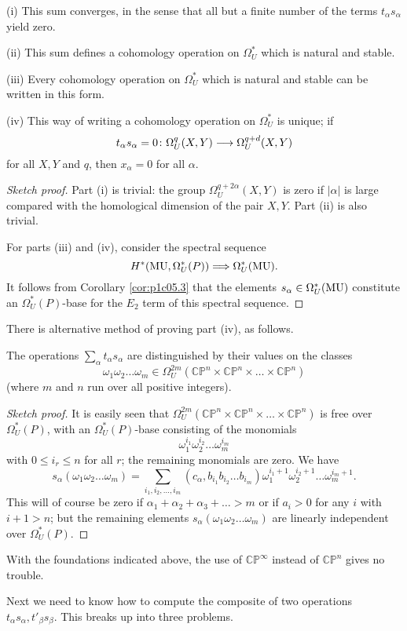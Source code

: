 \documentclass[../main]{subfiles}
\begin{document}
\begin{theorem}[Novikov]\label{thm:pc1c06.1}
(i) This sum converges, in the sense that all but a finite number of the terms $t_\alpha s_\alpha$ yield zero.

(ii) This sum defines a cohomology operation on $\Omega^*_U$ which is natural and stable.

(iii) Every cohomology operation on $\Omega_U^*$ which is natural and stable can be written in this form.

(iv) This way of writing a cohomology operation on $\Omega_U^*$ is unique; if 
    \[t_\alpha s_\alpha = 0 \colon \Omega^q_U(X,Y) \longrightarrow \Omega^{q+d}_U(X,Y)\]
    for all $X,Y$ and $q$, then $x_\alpha = 0$ for all $\alpha$.
\end{theorem}
\begin{proof}[Sketch proof]
Part (i) is trivial: the group $\Omega_U^{q+2\alpha}(X,Y)$ is zero if $|\alpha|$ is large compared with the homological dimension of the pair $X,Y$. Part (ii) is also trivial.

For parts (iii) and (iv), consider the spectral sequence
\[H^*(\mathrm{MU},\Omega_U^*(P)) \Longrightarrow \Omega^*_U(\mathrm{MU}).\]
It follows from Corollary \ref{cor:p1c05.3} that the elements $s_\alpha \in \Omega^*_U(\mathrm{MU})$ constitute an $\Omega_U^*(P)$-base for the $E_2$ term of this spectral sequence.
\end{proof}
There is alternative method of proving part (iv), as follows.
\begin{remark}[Novikov]\label{rmk:p1c06.2}
The operations $\sum_\alpha t_\alpha s_\alpha$ are distinguished by their values on the classes
\[\omega_1 \omega_2 \dots \omega_m \in \Omega_U^{2m}(\mathbb{CP}^n \times \mathbb{CP}^n \times \dots \times \mathbb{CP}^n)\]
(where $m$ and $n$ run over all positive integers).
\end{remark}
\begin{proof}[Sketch proof]
It is easily seen that $\Omega_U^{2m}(\mathbb{CP}^n \times \mathbb{CP}^n \times \dots \times \mathbb{CP}^n)$ is free over $\Omega_U^*(P)$, with an $\Omega_U^*(P)$-base consisting of the monomials 
\[\omega_1^{i_1} \omega_2^{i_2} \dots \omega_m^{i_m}\]
with $0 \leq i_r \leq n$ for all $r$; the remaining monomials are zero. We have \[s_\alpha(\omega_1\omega_2\dots\omega_m) = \sum_{i_1,i_2,\dots,i_m} (c_\alpha,b_{i_1} b_{i_2} \dots b_{i_m})\omega_1^{i_1 +1} \omega_2^{i_2+1} \dots \omega_m^{i_m + 1}.\]
This will of course be zero if $\alpha_1 + \alpha_2 + \alpha_3 + \dots > m$ or if $a_i > 0$ for any $i$ with $i+1 > n$; but the remaining elements $s_\alpha(\omega_1 \omega_2 \dots \omega_m)$ are linearly independent over $\Omega_U^*(P)$.
\end{proof}
\begin{note}
With the foundations indicated above, the use of $\mathbb{CP}^\infty$ instead of $\mathbb{CP}^n$ gives no trouble.
\end{note}
Next we need to know how to compute the composite of two operations $t_\alpha s_\alpha, t'_\beta s_\beta$. This breaks up into three problems.
\end{document}
